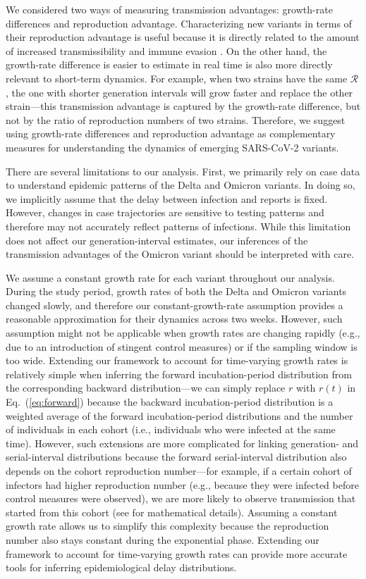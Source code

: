 \documentclass[12pt]{article}
\newcommand{\eref}[1]{Eq.~(\ref{eq:#1})}
\newcommand{\RR}{\ensuremath{{\mathcal R}}\xspace}
\begin{document}
We considered two ways of measuring transmission advantages: growth-rate differences and reproduction advantage.
Characterizing new variants in terms of their reproduction advantage is useful because it is directly related to the amount of increased transmissibility and immune evasion \citep{pearson2021bounding}.
On the other hand, the growth-rate difference is easier to estimate in real time is also more directly relevant to short-term dynamics. 
For example, when two strains have the same $\RR$, the one with shorter generation intervals will grow faster and replace the other strain---this transmission advantage is captured by the growth-rate difference, but not by the ratio of reproduction numbers of two strains.
Therefore, we suggest using growth-rate differences and reproduction advantage as complementary measures for understanding the dynamics of emerging SARS-CoV-2 variants.

There are several limitations to our analysis.
First, we primarily rely on case data to understand epidemic patterns of the Delta and Omicron variants.
In doing so, we implicitly assume that the delay between infection and reports is fixed.
However, changes in case trajectories are sensitive to testing patterns and therefore may not accurately reflect patterns of infections.
While this limitation does not affect our generation-interval estimates, our inferences of the transmission advantages of the Omicron variant should be interpreted with care.

We assume a constant growth rate for each variant throughout our analysis.
During the study period, growth rates of both the Delta and Omicron variants changed slowly, and therefore our constant-growth-rate assumption provides a reasonable approximation for their dynamics across two weeks.
However, such assumption might not be applicable when growth rates are changing rapidly (e.g., due to an introduction of stingent control measures) or if the sampling window is too wide.
Extending our framework to account for time-varying growth rates is relatively simple when inferring the forward incubation-period distribution from the corresponding backward distribution---we can simply replace $r$ with $r(t)$ in \eref{forward} because the backward incubation-period distribution is a weighted average of the forward incubation-period distributions and the number of individuals in each cohort (i.e., individuals who were infected at the same time).
However, such extensions are more complicated for linking generation- and serial-interval distributions because the forward serial-interval distribution also depends on the cohort reproduction number---for example, if a certain cohort of infectors had higher reproduction number (e.g., because they were infected before control measures were observed), we are more likely to observe transmission that started from this cohort (see \citep{park2021forward} for mathematical details).
Assuming a constant growth rate allows us to simplify this complexity because the reproduction number also stays constant during the exponential phase.
Extending our framework to account for time-varying growth rates can provide more accurate tools for inferring epidemiological delay distributions.
\end{document}
